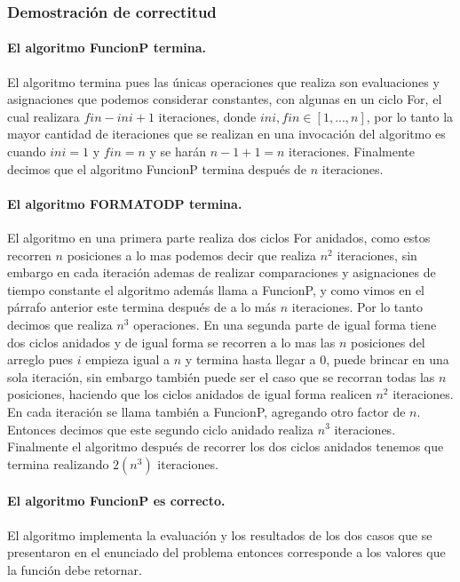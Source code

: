 \documentclass[12pt]{article}
\begin{document}
	\subsubsection{Demostración de correctitud}
	\paragraph{El algoritmo FuncionP termina.} El algoritmo termina pues las únicas operaciones que realiza son evaluaciones y asignaciones que podemos considerar constantes, con algunas en un ciclo For, el cual realizara $fin - ini + 1$ iteraciones, donde $ini, fin \in [1,...,n]$, por lo tanto la mayor cantidad de iteraciones que se realizan en una invocación del algoritmo es cuando $ini = 1$ y $fin = n$ y se harán $n - 1 + 1 = n$ iteraciones. Finalmente decimos que el algoritmo FuncionP termina después de $n$ iteraciones.\\
	\paragraph{El algoritmo FORMATODP termina.} El algoritmo en una primera parte realiza dos ciclos For anidados, como estos recorren $n$ posiciones a lo mas podemos decir que realiza $n^2$ iteraciones, sin embargo en cada iteración ademas de realizar comparaciones y asignaciones de tiempo constante el algoritmo además llama a FuncionP, y como vimos en el párrafo anterior este termina después de a lo más $n$ iteraciones. Por lo tanto decimos que realiza $n^3$ operaciones. En una segunda parte de igual forma tiene dos ciclos anidados y de igual forma se recorren a lo mas las $n$ posiciones del arreglo pues $i$ empieza igual a $n$ y termina hasta llegar a $0$, puede brincar en una sola iteración, sin embargo también puede ser el caso que se recorran todas las $n$ posiciones, haciendo que los ciclos anidados de igual forma realicen $n^2$ iteraciones. En cada iteración se llama también a FuncionP, agregando otro factor de $n$. Entonces decimos que este segundo ciclo anidado realiza $n^3$ iteraciones. Finalmente el algoritmo después de recorrer los dos ciclos anidados tenemos que termina realizando $2(n^3)$ iteraciones. 
	
	\paragraph{El algoritmo FuncionP es correcto.} El algoritmo implementa la evaluación y los resultados de los dos casos que se presentaron en el enunciado del problema entonces corresponde a los valores que la función debe retornar.
\end{document}
